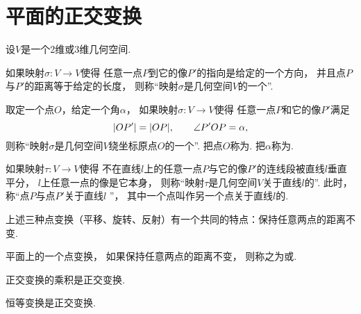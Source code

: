 \section{平面的正交变换}

设\(V\)是一个2维或3维几何空间.

如果映射\(\sigma\colon V \to V\)使得
任意一点\(P\)到它的像\(P'\)的指向是给定的一个方向，
并且点\(P\)与\(P'\)的距离等于给定的长度，
则称“映射\(\sigma\)是几何空间\(V\)的一个”.

取定一个点\(O\)，给定一个角\(\alpha\)，
如果映射\(\sigma\colon V \to V\)使得
任意一点\(P\)和它的像\(P'\)满足\begin{equation*}
	\abs{OP'}
	= \abs{OP},
	\qquad
	\angle P'OP = \alpha,
\end{equation*}
则称“映射\(\sigma\)是几何空间\(V\)绕坐标原点\(O\)的一个”.
把点\(O\)称为.
把\(\alpha\)称为.

如果映射\(\tau\colon V \to V\)使得
不在直线\(l\)上的任意一点\(P\)与它的像\(P'\)的连线段被直线\(l\)垂直平分，
\(l\)上任意一点的像是它本身，
则称“映射\(\tau\)是几何空间\(V\)关于直线\(l\)的”.
此时，称“点\(P\)与点\(P'\)关于直线\(l\) ”，
其中一个点叫作另一个点关于直线\(l\)的.

上述三种点变换（平移、旋转、反射）有一个共同的特点：保持任意两点的距离不变.

\begin{definition}
平面上的一个点变换，
如果保持任意两点的距离不变，
则称之为或.
\end{definition}

\begin{property}
正交变换的乘积是正交变换.
\end{property}

\begin{property}
恒等变换是正交变换.
\end{property}

